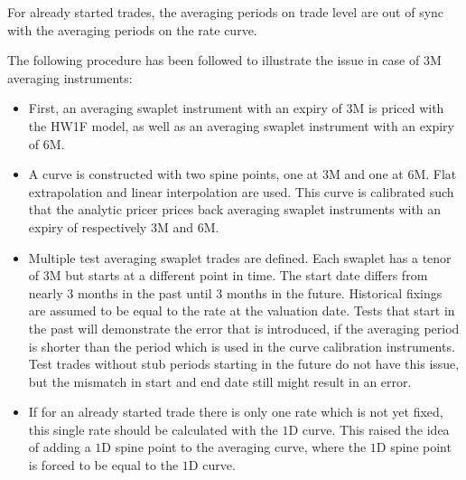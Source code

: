 \documentclass[]{pmv_report} %
\begin{document}
For already started trades, the averaging periods on trade level are out of sync with the averaging periods on the rate curve.

The following procedure has been followed to illustrate the issue in case of 3M averaging instruments:
\begin{itemize}
 \item First, an averaging swaplet instrument with an expiry of $3$M is priced with the HW1F model, as well as an averaging swaplet instrument with an expiry of $6$M.
 \item A curve is constructed with two spine points, one at $3$M and one at $6$M.
 Flat extrapolation and linear interpolation are used.
 This curve is calibrated such that the analytic pricer prices back averaging swaplet instruments with an expiry of respectively $3$M and $6$M.
 \item Multiple test averaging swaplet trades are defined.
 Each swaplet has a tenor of $3$M but starts at a different point in time.
 The start date differs from nearly $3$ months in the past until $3$ months in the future.
 Historical fixings are assumed to be equal to the rate at the valuation date.
 Tests that start in the past will demonstrate the error that is introduced, if the averaging period is shorter than the period which is used in the curve calibration instruments.
 Test trades without stub periods starting in the future do not have this issue, but the mismatch in start and end date still might result in an error.
 \item If for an already started trade there is only one rate which is not yet fixed, this single rate should be calculated with the $1$D curve.
 This raised the idea of adding a $1$D spine point to the averaging curve, where the $1$D spine point is forced to be equal to the $1$D curve.
\end{itemize}
\end{document}
